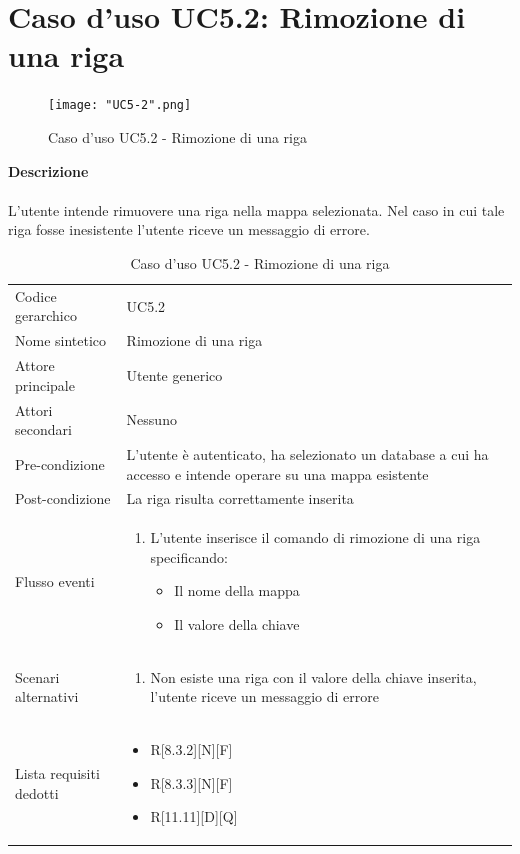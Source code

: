 \documentclass[a4paper]{report}
\begin{document}
	 \section{Caso d'uso UC5.2: Rimozione di una riga}
	 \begin{figure}[H]
			\centering
			\texttt{[image: "UC5-2".png]}
			\caption{Caso d'uso UC5.2 - Rimozione di una riga}
		\end{figure}
	 \textbf{Descrizione} \\ \\
	 L'utente intende rimuovere una riga nella mappa selezionata. Nel caso in cui tale riga fosse inesistente
	 l'utente riceve un messaggio di errore.
		\begin{table}[H]
		\begin{tabularx}{\textwidth}{X | X}\toprule
			\rowcolor{orange!65}Codice gerarchico & UC5.2\\
			Nome sintetico & Rimozione di una riga\\
			\rowcolor{orange!65}Attore principale & Utente generico\\
			Attori secondari & Nessuno \\
			\rowcolor{orange!65}Pre-condizione & L'utente è autenticato, ha selezionato un database a cui ha 
			accesso e intende operare su una mappa esistente\\
			Post-condizione & La riga risulta correttamente inserita\\
			\rowcolor{orange!65}Flusso eventi & \begin{enumerate}
			\item L'utente inserisce il comando di rimozione di una riga specificando:
			\begin{itemize}
				\item Il nome della mappa
				\item Il valore della chiave
			\end{itemize}
			\end{enumerate} \\
			Scenari alternativi & \begin{enumerate}
			\item Non esiste una riga con il valore della chiave inserita, l'utente riceve un messaggio di errore
			\end{enumerate}			 \\
			\rowcolor{orange!65}Lista requisiti dedotti & \begin{itemize}
				\item R[8.3.2][N][F]
				\item R[8.3.3][N][F]
				\item R[11.11][D][Q]
				\end{itemize} \\
			\bottomrule
		\end{tabularx}
		\caption{Caso d'uso UC5.2 - Rimozione di una riga}
	 \end{table}
	 
\end{document}
